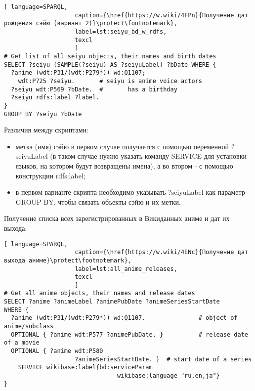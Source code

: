 \begin{lstlisting}[ language=SPARQL, 
                    caption={\href{https://w.wiki/4FPn}{Получение дат рождения сэйю (вариант 2)}\protect\footnotemark},
                    label=lst:seiyu_bd_w_rdfs,
                    texcl 
                    ]
# Get list of all seiyu objects, their names and birth dates
SELECT ?seiyu (SAMPLE(?seiyu) AS ?seiyuLabel) ?bDate WHERE {
  ?anime (wdt:P31/(wdt:P279*)) wd:Q1107;
    wdt:P725 ?seiyu.       # seiyu is anime voice actors
  ?seiyu wdt:P569 ?bDate.  #       has a birthday 
  ?seiyu rdfs:label ?label.
}
GROUP BY ?seiyu ?bDate
\end{lstlisting}%

Различия между скриптами:

\begin{itemize}
    \item метка (имя) сэйю в первом случае получается с помощью переменной ?seiyuLabel (в таком случае нужно указать команду SERVICE для установки языков, на котором будут возвращены имена), а во втором - с помощью конструкции rdfs:label;
    \item в первом варианте скрипта необходимо указывать ?seiyuLabel как параметр GROUP BY, чтобы связать объекты сэйю и их метки.
\end{itemize}

Получение списка всех зарегистрированных в Викиданных аниме и дат их выхода: 

\begin{lstlisting}[ language=SPARQL, 
                    caption={\href{https://w.wiki/4ENc}{Получение дат выхода аниме}\protect\footnotemark},
                    label=lst:all_anime_releases,
                    texcl 
                    ]
# Get all anime objects, their names and release dates
SELECT ?anime ?animeLabel ?animePubDate ?animeSeriesStartDate
WHERE {
  ?anime (wdt:P31/(wdt:P279*)) wd:Q1107.               # object of anime/subclass
  OPTIONAL { ?anime wdt:P577 ?animePubDate. }          # release date of a movie
  OPTIONAL { ?anime wdt:P580
					?animeSeriesStartDate. }  # start date of a series
    SERVICE wikibase:label{bd:serviceParam
					     		wikibase:language "ru,en,ja"}
}
\end{lstlisting}%

